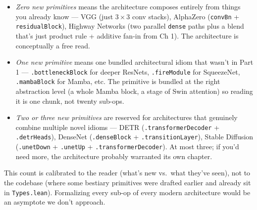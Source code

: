 \begin{itemize}
  \item \emph{Zero new primitives} means the architecture composes
    entirely from things you already know --- VGG (just $3\times 3$
    conv stacks), AlphaZero (\texttt{convBn} + \texttt{residualBlock}),
    Highway Networks (two parallel \texttt{dense} paths plus a blend
    that's just product rule + additive fan-in from Ch 1). The
    architecture is conceptually a free read.
  \item \emph{One new primitive} means one bundled architectural
    idiom that wasn't in Part 1 --- \texttt{.bottleneckBlock} for
    deeper ResNets, \texttt{.fireModule} for SqueezeNet,
    \texttt{.mambaBlock} for Mamba, etc. The primitive is bundled
    at the right abstraction level (a whole Mamba block, a stage of
    Swin attention) so reading it is one chunk, not twenty
    sub-ops.
  \item \emph{Two or three new primitives} are reserved for
    architectures that genuinely combine multiple novel idioms ---
    DETR (\texttt{.transformerDecoder} + \texttt{.detrHeads}),
    DenseNet (\texttt{.denseBlock} + \texttt{.transitionLayer}),
    Stable Diffusion (\texttt{.unetDown} + \texttt{.unetUp} +
    \texttt{.transformerDecoder}). At most three; if you'd need
    more, the architecture probably warranted its own chapter.
\end{itemize}

This count is calibrated to the reader (what's new vs.\ what
they've seen), not to the codebase (where some bestiary primitives
were drafted earlier and already sit in \texttt{Types.lean}).
Formalizing every sub-op of every modern architecture would be an
asymptote we don't approach.

